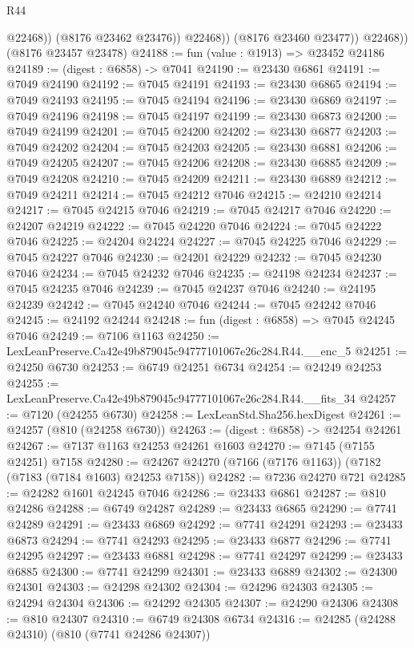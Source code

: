 \begin{lexlean}{R44}
\begin{coremodule}
{                    @22468))
                (@8176 @23462 @23476))
              @22468))
          (@8176 @23460 @23477))
        @22468))
    (@8176 @23457 @23478)
@24188 := fun (value : @1913) => @23452 @24186
@24189 := (digest : @6858) -> @7041
@24190 := @23430 @6861
@24191 := @7049 @24190
@24192 := @7045 @24191
@24193 := @23430 @6865
@24194 := @7049 @24193
@24195 := @7045 @24194
@24196 := @23430 @6869
@24197 := @7049 @24196
@24198 := @7045 @24197
@24199 := @23430 @6873
@24200 := @7049 @24199
@24201 := @7045 @24200
@24202 := @23430 @6877
@24203 := @7049 @24202
@24204 := @7045 @24203
@24205 := @23430 @6881
@24206 := @7049 @24205
@24207 := @7045 @24206
@24208 := @23430 @6885
@24209 := @7049 @24208
@24210 := @7045 @24209
@24211 := @23430 @6889
@24212 := @7049 @24211
@24214 := @7045 @24212 @7046
@24215 := @24210 @24214
@24217 := @7045 @24215 @7046
@24219 := @7045 @24217 @7046
@24220 := @24207 @24219
@24222 := @7045 @24220 @7046
@24224 := @7045 @24222 @7046
@24225 := @24204 @24224
@24227 := @7045 @24225 @7046
@24229 := @7045 @24227 @7046
@24230 := @24201 @24229
@24232 := @7045 @24230 @7046
@24234 := @7045 @24232 @7046
@24235 := @24198 @24234
@24237 := @7045 @24235 @7046
@24239 := @7045 @24237 @7046
@24240 := @24195 @24239
@24242 := @7045 @24240 @7046
@24244 := @7045 @24242 @7046
@24245 := @24192 @24244
@24248 := fun (digest : @6858) => @7045 @24245 @7046
@24249 := @7106 @1163
@24250 := LexLeanPreserve.Ca42e49b879045c94777101067e26c284.R44.__enc_5
@24251 := @24250 @6730
@24253 := @6749 @24251 @6734
@24254 := @24249 @24253
@24255 := LexLeanPreserve.Ca42e49b879045c94777101067e26c284.R44.__fits_34
@24257 := @7120 (@24255 @6730)
@24258 := LexLeanStd.Sha256.hexDigest
@24261 := @24257 (@810 (@24258 @6730))
@24263 := (digest : @6858) -> @24254 @24261
@24267 := @7137 @1163 @24253 @24261 @1603
@24270 := @7145 (@7155 @24251) @7158
@24280 := @24267 @24270 (@7166 (@7176 @1163)) (@7182 (@7183 (@7184 @1603) @24253 @7158))
@24282 := @7236 @24270 @721
@24285 := @24282 @1601 @24245 @7046
@24286 := @23433 @6861
@24287 := @810 @24286
@24288 := @6749 @24287
@24289 := @23433 @6865
@24290 := @7741 @24289
@24291 := @23433 @6869
@24292 := @7741 @24291
@24293 := @23433 @6873
@24294 := @7741 @24293
@24295 := @23433 @6877
@24296 := @7741 @24295
@24297 := @23433 @6881
@24298 := @7741 @24297
@24299 := @23433 @6885
@24300 := @7741 @24299
@24301 := @23433 @6889
@24302 := @24300 @24301
@24303 := @24298 @24302
@24304 := @24296 @24303
@24305 := @24294 @24304
@24306 := @24292 @24305
@24307 := @24290 @24306
@24308 := @810 @24307
@24310 := @6749 @24308 @6734
@24316 := @24285 (@24288 @24310) (@810 (@7741 @24286 @24307))
}
\end{coremodule}
\end{lexlean}
